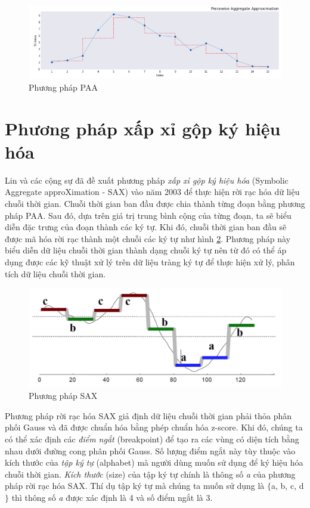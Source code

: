 \begin{figure}[H]
    \centering
    \includegraphics[scale=0.6]{./content/images/2-3pp.png}
    \caption{Phương pháp PAA}
    \label{fig:2-3pp}
\end{figure}

\section{Phương pháp xấp xỉ gộp ký hiệu hóa}
Lin và các cộng sự đã đề xuất phương pháp \textit{xấp xỉ gộp ký hiệu hóa} (Symbolic Aggregate approXimation - SAX) vào năm 2003 \cite{st36} để thực hiện rời rạc hóa dữ liệu chuỗi thời gian. Chuỗi thời gian ban đầu được chia thành từng đoạn bằng phương pháp PAA. Sau đó, dựa trên giá trị trung bình cộng của từng đoạn, ta sẽ biểu diễn đặc trưng của đoạn thành các ký tự. Khi đó, chuỗi thời gian ban đầu sẽ được mã hóa rời rạc thành một chuỗi các ký tự
như hình \ref{fig:2-3p}. Phương pháp này biểu diễn dữ liệu chuỗi thời gian thành dạng chuỗi ký tự nên từ đó có thể áp dụng được các kỹ thuật xử lý trên dữ liệu tràng ký tự để thực hiện xử lý, phân tích dữ liệu chuỗi thời gian.

\begin{figure}[H]
    \centering
    \includegraphics[scale=0.3]{./content/images/2-3p.png}
    \caption{Phương pháp SAX}
    \label{fig:2-3p}
\end{figure}

Phương pháp rời rạc hóa SAX giả định dữ liệu chuỗi thời gian phải thỏa phân phối Gauss và đã được chuẩn hóa bằng phép chuẩn hóa z-score. Khi đó, chúng ta có thể xác định các \textit{điểm ngắt} (breakpoint) để tạo ra các vùng có diện tích bằng nhau dưới đường cong phân phối Gauss. Số lượng điểm ngắt này tùy thuộc vào kích thước của \textit{tập ký tự} (alphabet) mà người dùng muốn sử dụng để ký hiệu hóa chuỗi thời gian. \textit{Kích thước} (size) của tập ký tự chính là thông số \textit{a} của phương pháp rời rạc hóa SAX. Thí dụ tập ký tự mà chúng ta muốn sử dụng là $\{$a, b, c, d$\}$ thì thông số \textit{a} được xác định là 4 và số điểm ngắt là 3.

